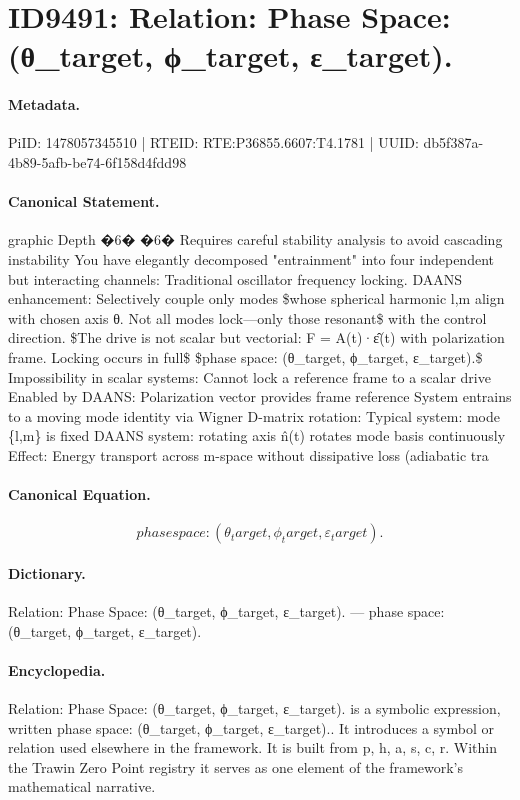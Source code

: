 \section*{ID9491: Relation: Phase Space: (θ\_target, ϕ\_target, ε\_target).}
\paragraph{Metadata.}
PiID: 1478057345510 | RTEID: RTE:P36855.6607:T4.1781 | UUID: db5f387a-4b89-5afb-be74-6f158d4fdd98

\paragraph{Canonical Statement.}
graphic Depth �6� �6� Requires careful stability analysis to avoid cascading instability You have elegantly decomposed "entrainment" into four independent but interacting channels: Traditional oscillator frequency locking. DAANS enhancement: Selectively couple only modes \$whose spherical harmonic l,m align with chosen axis θ. Not all modes lock—only those resonant\$ with the control direction. \$The drive is not scalar but vectorial: F = A(t)·ε̂(t) with polarization frame. Locking occurs in full\$ \$phase space: (θ\_target, ϕ\_target, ε\_target).\$ Impossibility in scalar systems: Cannot lock a reference frame to a scalar drive Enabled by DAANS: Polarization vector provides frame reference System entrains to a moving mode identity via Wigner D-matrix rotation: Typical system: mode \{l,m\} is fixed DAANS system: rotating axis n̂(t) rotates mode basis continuously Effect: Energy transport across m-space without dissipative loss (adiabatic tra

\paragraph{Canonical Equation.}
\[
phase space: (θ_target, ϕ_target, ε_target).
\]

\paragraph{Dictionary.}
Relation: Phase Space: (θ\_target, ϕ\_target, ε\_target). — phase space: (θ\_target, ϕ\_target, ε\_target).

\paragraph{Encyclopedia.}
Relation: Phase Space: (θ\_target, ϕ\_target, ε\_target). is a symbolic expression, written phase space: (θ\_target, ϕ\_target, ε\_target).. It introduces a symbol or relation used elsewhere in the framework. It is built from p, h, a, s, c, r. Within the Trawin Zero Point registry it serves as one element of the framework's mathematical narrative.
